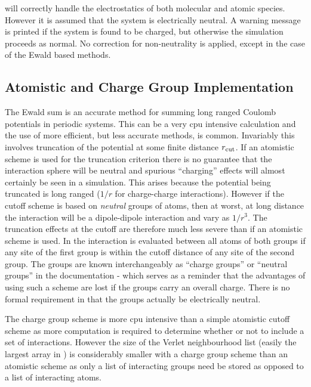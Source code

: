\D{} will correctly handle the electrostatics of both molecular
and atomic species. However it is assumed that the system is
electrically neutral. A warning message is printed if the system is
found to be charged, but otherwise the simulation proceeds as normal.
No correction for non-neutrality is applied, except in the case of the 
Ewald based methods.

\subsection{Atomistic and Charge Group Implementation}

The Ewald sum is an accurate method for summing
long ranged
Coulomb potentials in periodic
systems. This can be a very cpu intensive calculation and the use of
more efficient, but less accurate methods, is common. Invariably this
involves truncation of the potential at some finite distance $r_{\rm
cut}$. If an atomistic scheme is used for the truncation criterion
there is no guarantee that the interaction sphere will be neutral and
spurious ``charging'' effects will almost certainly be seen in a
simulation.  This arises because the potential being truncated is
long ranged ($1/r$ for charge-charge interactions). However if the
cutoff scheme is based on {\em neutral} groups of atoms, then at
worst, at long distance the interaction will be a dipole-dipole
interaction and vary as $1/r^3$. The truncation effects at the cutoff
are therefore much less severe than if an atomistic scheme is used. In
\D{} the interaction is evaluated between all atoms of both groups if
any site of the first group is within the cutoff distance of any site
of the second group.  The groups are known interchangeably as ``charge
groups'' or ``neutral groups'' in the documentation - which serves as
a reminder that the advantages of using such a scheme are lost if the
groups carry an overall charge. There is no formal requirement in \D{}
that the groups actually be electrically neutral.

The charge group scheme is more cpu intensive than a simple atomistic
cutoff scheme as more computation is required to determine whether
or not to include a set of interactions. However the size of the
Verlet neighbourhood list (easily the largest array in \D{}) is
considerably smaller with a charge group scheme than an atomistic
scheme as only a list of interacting groups need be stored as opposed
to a list of interacting atoms.

